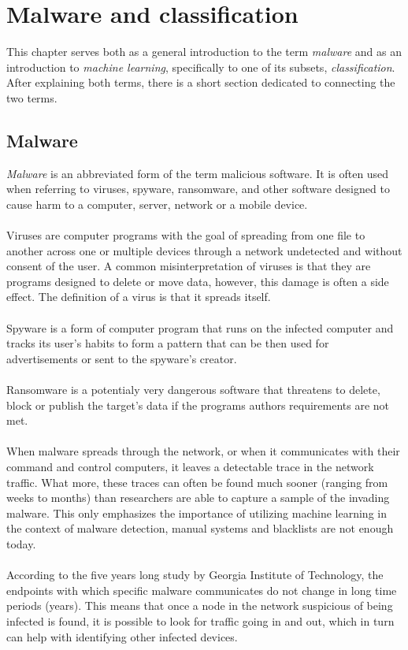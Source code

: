 \documentclass[11pt]{article}
\begin{document}
  \section{Malware and classification}
      This chapter serves both as a general introduction to the term {\it malware} and as an introduction to {\it machine learning}, specifically to one of its subsets, {\it classification}. After explaining both terms, there is a short section dedicated to connecting the two terms.
    \subsection{Malware}
      {\it Malware} is an abbreviated form of the term malicious software. It is often used when referring to viruses, spyware, ransomware, and other software designed to cause harm to a computer, server, network or a mobile device.\cite{malware}
      \\~\\
      Viruses are computer programs with the goal of spreading from one file to another across one or multiple devices through a network undetected and without consent of the user. A common misinterpretation of viruses is that they are programs designed to delete or move data, however, this damage is often a side effect. The definition of a virus is that it spreads itself.\cite{malware}
      \\~\\
      Spyware is a form of computer program that runs on the infected computer and tracks its user's habits to form a pattern that can be then used for advertisements or sent to the spyware's creator.\cite{malware}
      \\~\\
      Ransomware is a potentialy very dangerous software that threatens to delete, block or publish the target's data if the programs authors requirements are not met.\cite{ransomware}
      \\~\\
      When malware spreads through the network, or when it communicates with their command and control computers, it leaves a detectable trace in the network traffic. What more, these traces can often be found much sooner (ranging from weeks to months) than researchers are able to capture a sample of the invading malware.\cite{network} This only emphasizes the importance of utilizing machine learning in the context of malware detection, manual systems and blacklists are not enough today.
      \\~\\
      According to the five years long study by Georgia Institute of Technology, the endpoints with which specific malware communicates do not change in long time periods (years). This means that once a node in the network suspicious of being infected is found, it is possible to look for traffic going in and out, which in turn can help with identifying other infected devices.\cite{network}
\end{document}
